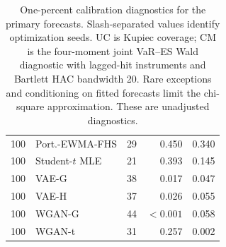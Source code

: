 \documentclass[11pt]{article}
\theoremstyle{definition}\newtheorem{definition}[theorem]{Definition}
\theoremstyle{remark}\newtheorem{remark}[theorem]{Remark}
\begin{document}
\begin{table}[htbp]
\begin{tabular}{llrrr}
100 & Port.-EWMA-FHS & 29 & 0.450 & 0.340 \\
100 & Student-$t$ MLE & 21 & 0.393 & 0.145 \\
100 & VAE-G & 38 & 0.017 & 0.047 \\
100 & VAE-H & 37 & 0.026 & 0.055 \\
100 & WGAN-G & 44 & $<0.001$ & 0.058 \\
100 & WGAN-t & 31 & 0.257 & 0.002 \\
\bottomrule
\end{tabular}
\caption{One-percent calibration diagnostics for the primary forecasts. Slash-separated values identify optimization seeds. UC is Kupiec coverage; CM is the four-moment joint VaR--ES Wald diagnostic with lagged-hit instruments and Bartlett HAC bandwidth 20. Rare exceptions and conditioning on fitted forecasts limit the chi-square approximation. These are unadjusted diagnostics.}\label{tab:r4-calibration}
\end{table}
\end{document}
